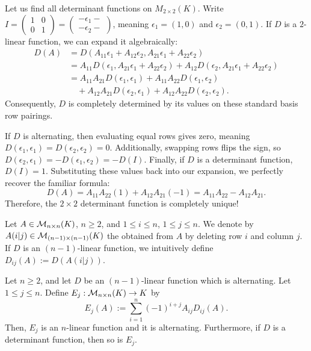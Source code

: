 \begin{example}[Warmup]
  Let us find all determinant functions on $M_{2 \times 2}(K)$. Write $I = \left(\begin{smallmatrix} 1 & 0 \\ 0 & 1 \end{smallmatrix}\right) = \left(\begin{smallmatrix} -\epsilon_1- \\ -\epsilon_2- \end{smallmatrix}\right)$, meaning $\epsilon_1 = (1,0)$ and $\epsilon_2 = (0,1)$.
  If $D$ is a $2$-linear function, we can expand it algebraically:
  \begin{align*}
    D(A) &= D(A_{11}\epsilon_1 + A_{12}\epsilon_2, A_{21}\epsilon_1 + A_{22}\epsilon_2) \\
    &= A_{11} D(\epsilon_1, A_{21}\epsilon_1 + A_{22}\epsilon_2) + A_{12} D(\epsilon_2, A_{21}\epsilon_1 + A_{22}\epsilon_2) \\
    &= A_{11}A_{21}D(\epsilon_1, \epsilon_1) + A_{11}A_{22}D(\epsilon_1, \epsilon_2) \\
    &\quad + A_{12}A_{21}D(\epsilon_2, \epsilon_1) + A_{12}A_{22}D(\epsilon_2, \epsilon_2).
  \end{align*}
  Consequently, $D$ is completely determined by its values on these standard basis row pairings.

  If $D$ is alternating, then evaluating equal rows gives zero, meaning $D(\epsilon_1, \epsilon_1) = D(\epsilon_2, \epsilon_2) = 0$. Additionally, swapping rows flips the sign, so $D(\epsilon_2, \epsilon_1) = -D(\epsilon_1, \epsilon_2) = -D(I)$.
  Finally, if $D$ is a determinant function, $D(I) = 1$. Substituting these values back into our expansion, we perfectly recover the familiar formula:
  \[
  D(A) = A_{11}A_{22}(1) + A_{12}A_{21}(-1) = A_{11}A_{22} - A_{12}A_{21}.
  \]
  Therefore, the $2 \times 2$ determinant function is completely unique!
\end{example}

\begin{definition}[Submatrix]\label{def:minor_submatrix}
  Let $A \in \mathcal{M}_{n \times n}(K)$, $n \ge 2$, and $1 \le i \le n$, $1 \le j \le n$. We denote by $A(i|j) \in \mathcal{M}_{(n-1) \times (n-1)}(K)$ the  obtained from $A$ by deleting row $i$ and column $j$. If $D$ is an $(n-1)$-linear function, we intuitively define $D_{ij}(A) := D(A(i|j))$.
\end{definition}

\begin{theorem}\label{thm:recursive_det}
  Let $n \ge 2$, and let $D$ be an $(n-1)$-linear function which is alternating. Let $1 \le j \le n$. Define $E_j : \mathcal{M}_{n \times n}(K) \to K$ by
  \[
  E_j(A) := \sum_{i=1}^n (-1)^{i+j} A_{ij} D_{ij}(A).
  \]
  Then, $E_j$ is an $n$-linear function and it is alternating. Furthermore, if $D$ is a determinant function, then so is $E_j$.
\end{theorem}

